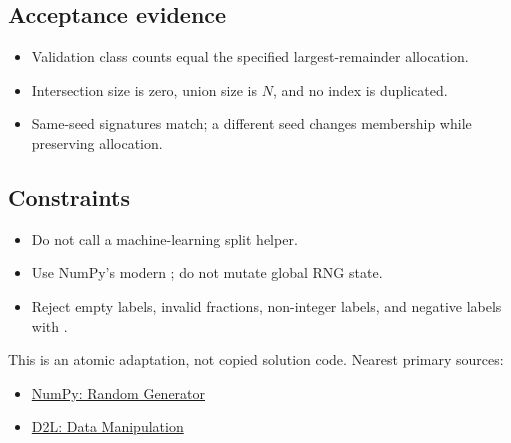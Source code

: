         \subsection{Acceptance evidence}

        \begin{evidencebox}
        \begin{itemize}
          \item Validation class counts equal the specified largest-remainder allocation.
  \item Intersection size is zero, union size is $N$, and no index is duplicated.
  \item Same-seed signatures match; a different seed changes membership while preserving allocation.
        \end{itemize}
        \end{evidencebox}

        \subsection{Constraints}

        \begin{itemize}
          \item Do not call a machine-learning split helper.
  \item Use NumPy's modern ; do not mutate global RNG state.
  \item Reject empty labels, invalid fractions, non-integer labels, and negative labels with .
        \end{itemize}

        \begin{sourcebox}
        This is an atomic adaptation, not copied solution code. Nearest primary sources:
        \begin{itemize}
          \item \href{https://numpy.org/doc/stable/reference/random/generator.html}{NumPy: Random Generator}
  \item \href{https://d2l.ai/chapter_preliminaries/ndarray.html}{D2L: Data Manipulation}
        \end{itemize}
        \end{sourcebox}
